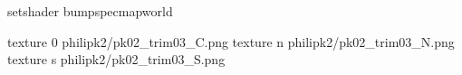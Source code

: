 setshader bumpspecmapworld

texture 0 philipk2/pk02_trim03_C.png
texture n philipk2/pk02_trim03_N.png
texture s philipk2/pk02_trim03_S.png

